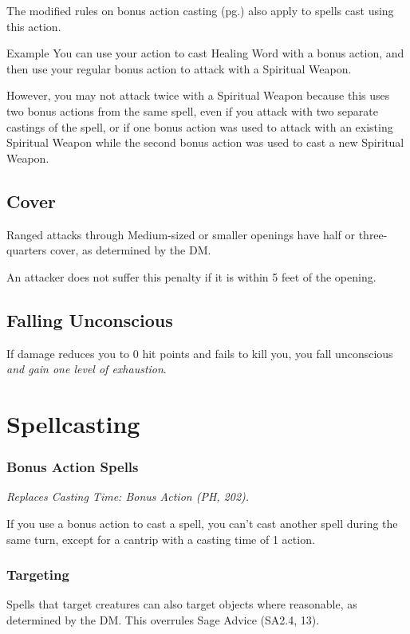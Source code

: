 \documentclass[House_Rules.tex]{subfiles}
\begin{document}
The modified rules on bonus action casting (pg.\pageref{bonusActionSpells}) also apply to spells cast using this action.

\begin{DndComment}{Example}
You can use your action to cast Healing Word with a bonus action, and then use your regular bonus action to attack with a Spiritual Weapon. 

However, you may not attack twice with a Spiritual Weapon because this uses two bonus actions from the same spell, even if you attack with two separate castings of the spell, or if one bonus action was used to attack with an existing Spiritual Weapon while the second bonus action was used to cast a new Spiritual Weapon.
\end{DndComment}

\subsection{Cover}
Ranged attacks through Medium-sized or smaller openings have half or three-quarters cover, as determined by the DM. 

An attacker does not suffer this penalty if it is within 5 feet of the opening.

\subsection{Falling Unconscious}
If damage reduces you to 0 hit points and fails to kill you, you fall unconscious \textit{and gain one level of exhaustion}.


\section{Spellcasting}

\subsubsection{Bonus Action Spells}
\label{bonusActionSpells}
\textit{Replaces Casting Time: Bonus Action (PH, 202).}

If you use a bonus action to cast a spell, you can't cast another spell during the same turn, except for a cantrip with a casting time of 1 action.

\subsubsection{Targeting}
Spells that target creatures can also target objects where reasonable, as determined by the DM. This overrules Sage Advice (SA2.4, 13).
\end{document}
